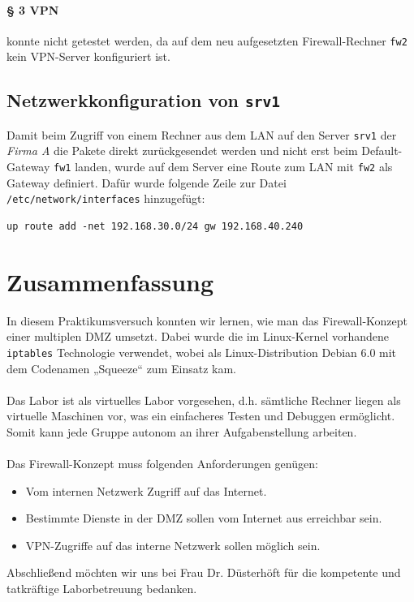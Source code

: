 \paragraph{§ 3 VPN}
konnte nicht getestet werden, da auf dem neu aufgesetzten Firewall-Rechner
{\tt fw2} kein VPN-Server konfiguriert ist.


\subsection{Netzwerkkonfiguration von {\tt srv1}}

Damit beim Zugriff von einem Rechner aus dem LAN auf den Server
{\tt srv1} der \emph{Firma A} die Pakete direkt zurückgesendet werden und nicht
erst beim Default-Gateway {\tt fw1} landen, wurde auf dem
Server eine Route zum LAN mit {\tt fw2} als Gateway definiert.
Dafür wurde folgende Zeile zur Datei {\tt /etc/network/interfaces} hinzugefügt:
\begin{verbatim}
up route add -net 192.168.30.0/24 gw 192.168.40.240
\end{verbatim}


\newpage
\section{Zusammenfassung}

In diesem Praktikumsversuch konnten wir lernen, wie man das Firewall-Konzept
einer multiplen DMZ umsetzt. Dabei wurde die im Linux-Kernel vorhandene
{\tt iptables} Technologie verwendet, wobei als Linux-Distribution Debian 6.0
mit dem Codenamen „Squeeze“ zum Einsatz kam.
\\ \\
\noindent Das Labor ist als virtuelles Labor vorgesehen, d.h. sämtliche Rechner liegen
als virtuelle Maschinen vor, was ein einfacheres Testen und Debuggen ermöglicht.
Somit kann jede Gruppe autonom an ihrer Aufgabenstellung arbeiten.
\\ \\
\noindent Das Firewall-Konzept muss folgenden Anforderungen genügen:

\begin{itemize}
  \item Vom internen Netzwerk Zugriff auf das Internet.
  \item Bestimmte Dienste in der DMZ sollen vom Internet aus erreichbar sein.
  \item VPN-Zugriffe auf das interne Netzwerk sollen möglich sein.
\end{itemize}

\noindent Abschließend möchten wir uns bei Frau Dr. Düsterhöft für die
kompetente und tatkräftige Laborbetreuung bedanken.
